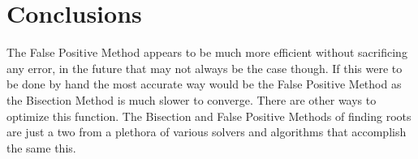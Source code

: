 \documentclass[12pt, letterpaper]{article}
\begin{document}
\section{Conclusions}
	The False Positive Method appears to be much more efficient without sacrificing any error, in the future that may not always be the case though. If this were to be done by hand the most accurate way would be the False Positive Method as the Bisection Method is much slower to converge. There are other ways to optimize this function. The Bisection and False Positive Methods of finding roots are just a two from a plethora of various solvers and algorithms that accomplish the same this. 

\pagebreak
	
\appendix
\end{document}
